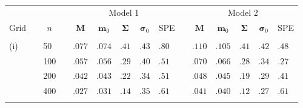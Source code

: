 \documentclass[titlepage,12pt]{article}
\begin{document}
\begin{table}[tbp] \centering%

\begin{tabular}{llllccccccccccc}
&  &  &  & \multicolumn{5}{c}{Model 1} &  & \multicolumn{5}{c}{Model 2} \\ 
\cline{5-9}\cline{11-15}
\multicolumn{1}{c}{Grid} & \multicolumn{1}{c}{} & \multicolumn{1}{c}{$n$} & 
\multicolumn{1}{c}{} & $\mathbf{M}$ & $\mathbf{m}_{0}$ & $\mathbf{\Sigma }$
& $\mathbf{\sigma }_{0}$ & \textrm{SPE} &  & $\mathbf{M}$ & $\mathbf{m}_{0}$
& $\mathbf{\Sigma }$ & $\mathbf{\sigma }_{0}$ & \textrm{SPE} \\ \hline
&  &  &  &  &  &  &  &  &  & \multicolumn{1}{l}{} & \multicolumn{1}{l}{} & 
\multicolumn{1}{l}{} & \multicolumn{1}{l}{} & \multicolumn{1}{l}{} \\ 
(i) &  & 50 &  & \multicolumn{1}{l}{$.077$} & \multicolumn{1}{l}{$.074$} & 
\multicolumn{1}{l}{$.41$} & \multicolumn{1}{l}{$.43$} & \multicolumn{1}{l}{$%
.80$} &  & \multicolumn{1}{l}{$.110$} & \multicolumn{1}{l}{$.105$} & 
\multicolumn{1}{l}{$.41$} & \multicolumn{1}{l}{$.42$} & \multicolumn{1}{l}{$%
.48$} \\ 
&  & 100 &  & \multicolumn{1}{l}{$.057$} & \multicolumn{1}{l}{$.056$} & 
\multicolumn{1}{l}{$.29$} & \multicolumn{1}{l}{$.40$} & \multicolumn{1}{l}{$%
.51$} &  & \multicolumn{1}{l}{$.070$} & \multicolumn{1}{l}{$.066$} & 
\multicolumn{1}{l}{$.28$} & \multicolumn{1}{l}{$.34$} & \multicolumn{1}{l}{$%
.27$} \\ 
&  & 200 &  & \multicolumn{1}{l}{$.042$} & \multicolumn{1}{l}{$.043$} & 
\multicolumn{1}{l}{$.22$} & \multicolumn{1}{l}{$.34$} & \multicolumn{1}{l}{$%
.51$} &  & \multicolumn{1}{l}{$.048$} & \multicolumn{1}{l}{$.045$} & 
\multicolumn{1}{l}{$.19$} & \multicolumn{1}{l}{$.29$} & \multicolumn{1}{l}{$%
.41$} \\ 
&  & 400 &  & \multicolumn{1}{l}{$.027$} & \multicolumn{1}{l}{$.031$} & 
\multicolumn{1}{l}{$.14$} & \multicolumn{1}{l}{$.35$} & \multicolumn{1}{l}{$%
.61$} &  & \multicolumn{1}{l}{$.041$} & \multicolumn{1}{l}{$.040$} & 
\multicolumn{1}{l}{$.12$} & \multicolumn{1}{l}{$.27$} & \multicolumn{1}{l}{$%
.61$} \\ 
&  &  &  & \multicolumn{1}{l}{} & \multicolumn{1}{l}{} & \multicolumn{1}{l}{}
& \multicolumn{1}{l}{} & \multicolumn{1}{l}{} &  & \multicolumn{1}{l}{} & 
\multicolumn{1}{l}{} & \multicolumn{1}{l}{} & \multicolumn{1}{l}{} & 

\end{tabular}
\end{table}
\end{document}
